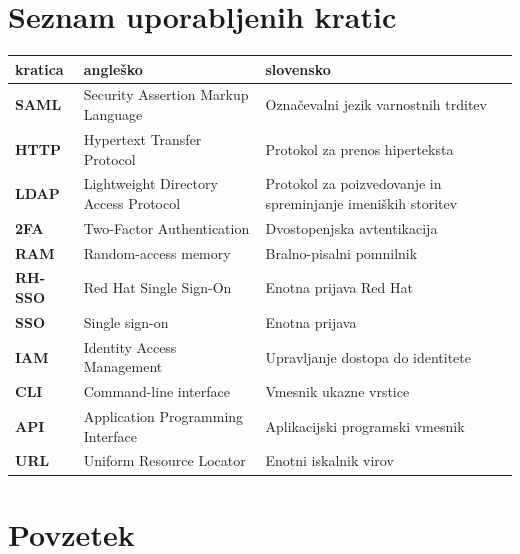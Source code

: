 \documentclass[a4paper,12pt,openright,oneside]{book}
\newcommand{\clearemptydoublepage}{\newpage{\pagestyle{empty}\cleardoublepage}}
\begin{document}
\clearemptydoublepage

\pagestyle{empty}
\def\thepage{}%
\tableofcontents{}


\clearemptydoublepage


\chapter*{Seznam uporabljenih kratic}
\noindent\begin{tabular}{p{}|p{}|p{}}    %
  {\bf kratica} & {\bf angleško}                              & {\bf slovensko} \\ \hline
  {\bf SAML}      & Security Assertion Markup Language               & Označevalni jezik varnostnih trditev \\
  {\bf HTTP} & Hypertext Transfer Protocol & Protokol za prenos hiperteksta \\
  {\bf LDAP} & Lightweight Directory Access Protocol & Protokol za poizvedovanje in spreminjanje imeniških storitev\\
  {\bf 2FA} & Two-Factor Authentication & Dvostopenjska avtentikacija \\
  {\bf RAM} & Random-access memory & Bralno-pisalni pomnilnik \\
  {\bf RH-SSO} & Red Hat Single Sign-On & Enotna prijava Red Hat \\
  {\bf SSO} & Single sign-on & Enotna prijava \\
  {\bf IAM} & Identity Access Management & Upravljanje dostopa do identitete \\
  {\bf CLI} & Command-line interface & Vmesnik ukazne vrstice \\
  {\bf API} & Application Programming Interface & Aplikacijski programski vmesnik \\
  {\bf URL} & Uniform Resource Locator & Enotni iskalnik virov \\
  
\end{tabular}


\clearemptydoublepage

\chapter*{Povzetek}
\end{document}
